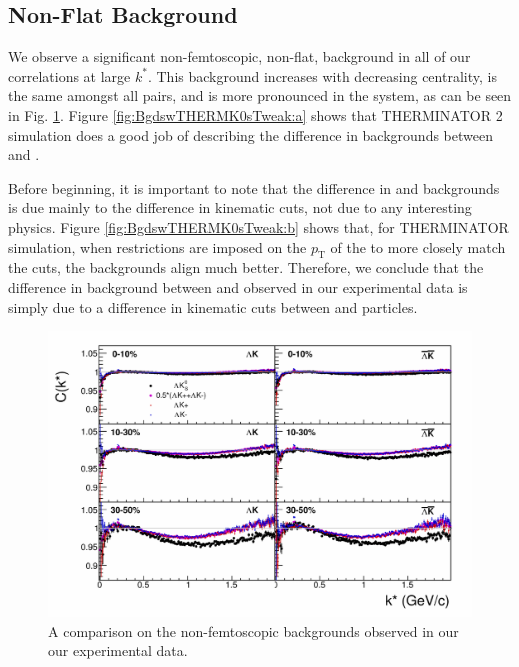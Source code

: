 \documentclass[/home/jesse/Analysis/FemtoAnalysis/AnalysisNotes/AnalysisNoteJBuxton.tex]{subfiles}
\begin{document}
\subsection{Non-Flat Background}
\label{NonFlatBackground}

We observe a significant non-femtoscopic, non-flat, background in all of our correlations at large $k^{*}$.  
This background increases with decreasing centrality, is the same amongst all \LamKpm pairs, and is more pronounced in the \LamKs system, as can be seen in Fig. \ref{fig:CompareAllBgds}.  
Figure \ref{fig:BgdswTHERMK0sTweak:a} shows that THERMINATOR 2 simulation does a good job of describing the difference in backgrounds between \LamKpm and \LamKs.

Before beginning, it is important to note that the difference in \LamKpm and \LamKs backgrounds is due mainly to the difference in kinematic cuts, not due to any interesting physics.  
Figure \ref{fig:BgdswTHERMK0sTweak:b} shows that, for THERMINATOR simulation, when restrictions are imposed on the $p_{\textrm{T}}$ of the \Ks to more closely match the \Kpm cuts, the backgrounds align much better.  
Therefore, we conclude that the difference in background between \LamKpm and \LamKs observed in our experimental data is simply due to a difference in kinematic cuts between \Kpm and \Ks particles.

\begin{figure}[h]
  \centering
  \includegraphics[width=\textwidth]{5_Fitting/Figures/CompareLamKchAvgToLamK0_wIndivKch_0010_1030_3050.pdf}
  \caption[Compare Non-Femtoscopic Backgrounds]{A comparison on the non-femtoscopic backgrounds observed in our our \LamK experimental data.}
  \label{fig:CompareAllBgds}
\end{figure}
\end{document}

